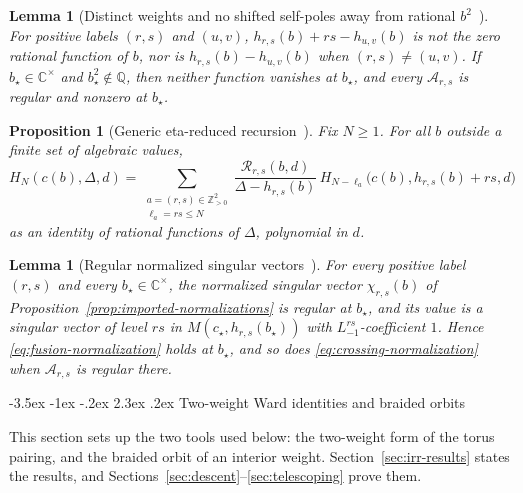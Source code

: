 \documentclass[twoside,10pt]{article}
\makeatletter
\numberwithin{equation}{section}
\theoremstyle{slbody}
\newtheorem{proposition}[theorem]{Proposition}
\newtheorem{lemma}[theorem]{Lemma}
\theoremstyle{definition}
\theoremstyle{remark}
\renewcommand{\section}{%
  \@startsection{section}{1}{\z@}%
    {-3.5ex \@plus -1ex \@minus -.2ex}%
    {2.3ex \@plus .2ex}%
    {\normalfont\large\bfseries}}
\makeatother
\begin{document}
\begin{lemma}[Distinct weights and no shifted self-poles away from
rational \(b^2\)~{\cite[Lemma~6.3]{PolzerColliding2026}}]
\label{lem:no-generic-shifted-pole}
For positive labels \((r,s)\) and \((u,v)\), \(h_{r,s}(b)+rs-h_{u,v}(b)\)
is not the zero rational function of \(b\), nor is
\(h_{r,s}(b)-h_{u,v}(b)\) when \((r,s)\neq(u,v)\).  If
\(b_\star\in\mathbb C^\times\) and \(b_\star^2\notin\mathbb Q\), then
neither function vanishes at \(b_\star\), and every
\({\mathcal A}_{r,s}\) is regular and nonzero at \(b_\star\).
\end{lemma}

\begin{proposition}[Generic eta-reduced recursion~{\cite[Proposition~6.4]{PolzerColliding2026}}]
\label{prop:generic-recursion}
Fix \(N\geq1\).  For all \(b\) outside a finite set of algebraic values,
\[
 H_N(c(b),\Delta,d)
 =\sum_{\substack{a=(r,s)\in\mathbb Z_{>0}^2\\ \ell_a=rs\leq N}}
 \frac{{\mathcal R}_{r,s}(b,d)}{\Delta-h_{r,s}(b)}\,
 H_{N-\ell_a}\bigl(c(b),h_{r,s}(b)+rs,d\bigr)
\]
as an identity of rational functions of \(\Delta\), polynomial in
\(d\).
\end{proposition}

\begin{lemma}[Regular normalized singular vectors~{\cite[Lemma~6.6]{PolzerColliding2026}}]
\label{lem:regular-everywhere}
For every positive label \((r,s)\) and every \(b_\star\in\mathbb C^\times\),
the normalized singular vector \(\chi_{r,s}(b)\) of
Proposition~\ref{prop:imported-normalizations} is regular at \(b_\star\),
and its value is a singular vector of level \(rs\) in
\(M(c_\star,h_{r,s}(b_\star))\) with \(L_{-1}^{rs}\)-coefficient \(1\).
Hence \eqref{eq:fusion-normalization} holds at \(b_\star\), and so does
\eqref{eq:crossing-normalization} when \({\mathcal A}_{r,s}\) is regular
there.
\end{lemma}

\section{Two-weight Ward identities and braided orbits}\label{sec:setup}

This section sets up the two tools used below: the two-weight form of the torus pairing, and
the braided orbit of an interior weight.  Section~\ref{sec:irr-results} states
the results, and Sections~\ref{sec:descent}--\ref{sec:telescoping} prove them.
\end{document}
